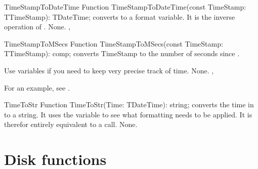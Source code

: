 \html{}
 
\begin{function}{TimeStampToDateTime}
\Declaration
Function TimeStampToDateTime(const TimeStamp: TTimeStamp): TDateTime;
\Description
{} converts  to a 
format variable. It is the inverse operation of .
\Errors
None.
\SeeAlso
{}, 
\end{function}

\html{}

\begin{function}{TimeStampToMSecs}
\Declaration
Function TimeStampToMSecs(const TimeStamp: TTimeStamp): comp;
\Description
{} converts {TimeStamp} to the number of seconds
since .

Use  variables if you need to keep very precise track of
time.
\Errors
None.
\SeeAlso
{}, 
\end{function}

For an example, see .

\begin{function}{TimeToStr}
\Declaration
Function TimeToStr(Time: TDateTime): string;
\Description
{} converts the time in  to a string. It uses
the  variable to see what formatting needs to be
applied. It is therefor entirely equivalent to a
 call.
\Errors
None.
\SeeAlso
\end{function}

\html{}
 

\section{Disk functions}


